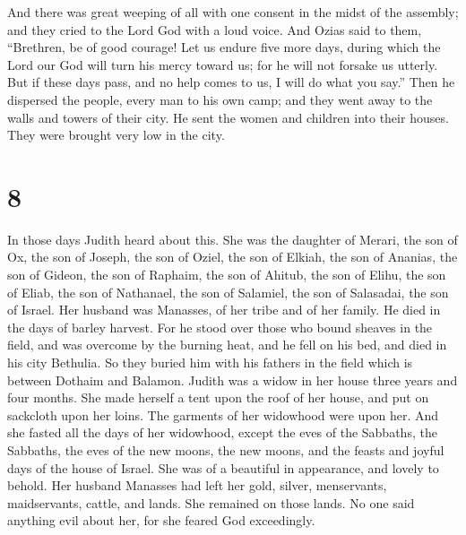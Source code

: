  And there was great weeping of all with one consent in
the midst of the assembly; and they cried to the Lord God with a loud
voice.  And Ozias said to them, ``Brethren, be of good
courage! Let us endure five more days, during which the Lord our God
will turn his mercy toward us; for he will not forsake us utterly.
 But if these days pass, and no help comes to us, I will
do what you say.''  Then he dispersed the people, every
man to his own camp; and they went away to the walls and towers of their
city. He sent the women and children into their houses. They were
brought very low in the city.

\hypertarget{section-7}{%
\section{8}\label{section-7}}

 In those days Judith heard about this. She was the
daughter of Merari, the son of Ox, the son of Joseph, the son of Oziel,
the son of Elkiah, the son of Ananias, the son of Gideon, the son of
Raphaim, the son of Ahitub, the son of Elihu, the son of Eliab, the son
of Nathanael, the son of Salamiel, the son of Salasadai, the son of
Israel.  Her husband was Manasses, of her tribe and of her
family. He died in the days of barley harvest.  For he
stood over those who bound sheaves in the field, and was overcome by the
burning heat, and he fell on his bed, and died in his city Bethulia. So
they buried him with his fathers in the field which is between Dothaim
and Balamon.  Judith was a widow in her house three years
and four months.  She made herself a tent upon the roof of
her house, and put on sackcloth upon her loins. The garments of her
widowhood were upon her.  And she fasted all the days of
her widowhood, except the eves of the Sabbaths, the Sabbaths, the eves
of the new moons, the new moons, and the feasts and joyful days of the
house of Israel.  She was of a beautiful in appearance,
and lovely to behold. Her husband Manasses had left her gold, silver,
menservants, maidservants, cattle, and lands. She remained on those
lands.  No one said anything evil about her, for she
feared God exceedingly.

